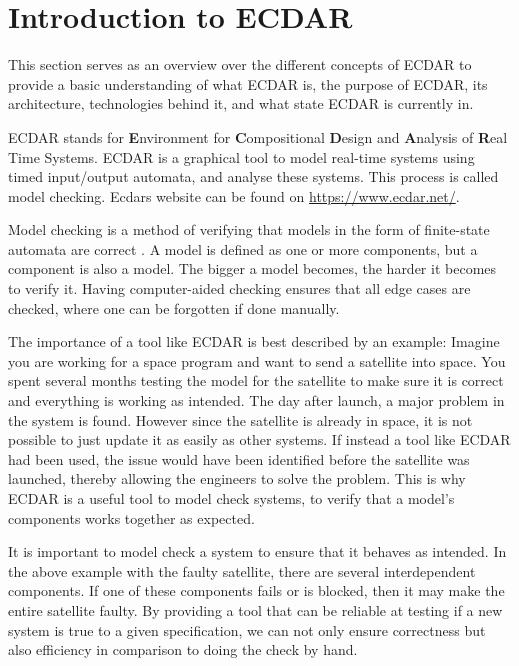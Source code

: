 \section{Introduction to ECDAR}\label{sec:introduction-to-ecdar}
\commondisclaimer

This section serves as an overview over the different concepts of ECDAR to provide a basic understanding of what ECDAR is, the purpose of ECDAR, its architecture, technologies behind it, and what state ECDAR is currently in.

ECDAR stands for \textbf{E}nvironment for \textbf{C}ompositional \textbf{D}esign and \textbf{A}nalysis of \textbf{R}eal Time Systems.
ECDAR is a graphical tool to model real-time systems using timed input/output automata, and analyse these systems. 
This process is called model checking. Ecdars website can be found on \href{https://www.ecdar.net/}{https://www.ecdar.net/}.

Model checking is a method of verifying that models in the form of finite-state automata are correct \cite{modelchecking-handbook}. A model is defined as one or more components, but a component is also a model.
The bigger a model becomes, the harder it becomes to verify it. 
Having computer-aided checking ensures that all edge cases are checked, where one can be forgotten if done manually.
 
The importance of a tool like ECDAR is best described by an example:
Imagine you are working for a space program and want to send a satellite into space.
You spent several months testing the model for the satellite to make sure it is correct and everything is working as intended.
The day after launch, a major problem in the system is found. However since the satellite is already in space, it is not possible to just update it as easily as other systems. If instead a tool like ECDAR had been used, the issue would have been identified before the satellite was launched, thereby allowing the engineers to solve the problem.
This is why ECDAR is a useful tool to model check systems, to verify that a model's components works together as expected.



It is important to model check a system to ensure that it behaves as intended.
In the above example with the faulty satellite, there are several interdependent components.
If one of these components fails or is blocked, then it may make the entire satellite faulty.
By providing a tool that can be reliable at testing if a new system is true to a given specification, we can not only ensure correctness but also efficiency in comparison to doing the check by hand.


